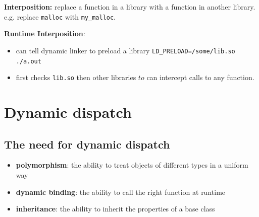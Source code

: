 \documentclass[letterpaper,12pt]{article}
\begin{document}
\textbf{Interposition:} replace a function in a library with a function in another library. e.g. replace \texttt{malloc} with \texttt{my\_malloc}.

\textbf{Runtime Interposition}: \begin{itemize}
    \item can tell dynamic linker to preload a library \texttt{LD\_PRELOAD=/some/lib.so ./a.out}
    \item first checks \texttt{lib.so} then other libraries $to$ can intercept calls to any function.
\end{itemize}
\section{Dynamic dispatch}
\subsection{The need for dynamic dispatch}
\begin{itemize}
    \item \textbf{polymorphism}: the ability to treat objects of different types in a uniform way
    \item \textbf{dynamic binding}: the ability to call the right function at runtime
    \item \textbf{inheritance}: the ability to inherit the properties of a base class
\end{itemize}
\end{document}
